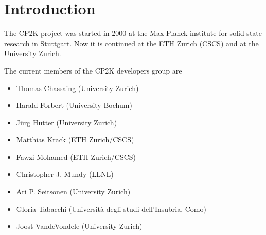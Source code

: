 \documentclass[12pt,twoside]{article}
\newcommand{\bi}{\begin{itemize}}
\newcommand{\ei}{\end{itemize}}
\begin{document}
\section{Introduction}
%
The CP2K project was started in 2000 at the Max-Planck institute for
solid state research in Stuttgart. Now it is continued at the
ETH Zurich (CSCS) and at the University Zurich.

The current members of the CP2K developers group are
\bi
 \item Thomas Chassaing (University Zurich)
 \item Harald Forbert (University Bochum)
 \item J\"urg Hutter (University Zurich)
 \item Matthias Krack (ETH Zurich/CSCS)
 \item Fawzi Mohamed (ETH Zurich/CSCS)
 \item Christopher J. Mundy (LLNL)
 \item Ari P. Seitsonen (University Zurich)
 \item Gloria Tabacchi (Universit\`a degli studi dell'Insubria, Como)
 \item Joost VandeVondele (University Zurich)
\ei
\newpage
%
\end{document}
